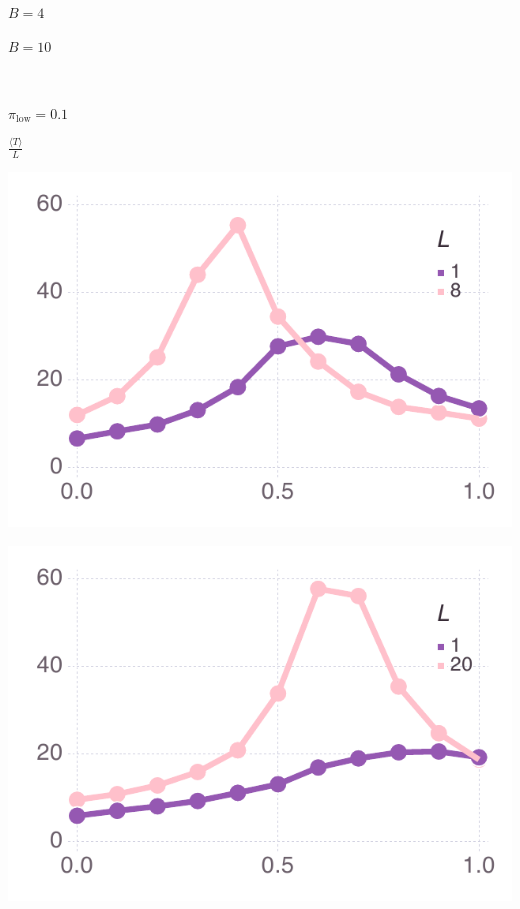 \documentclass[varwidth=true,crop=false]{standalone}
\newcommand{\pisub}[1]{\pi_{\mathrm{#1}}}
\newcommand{\pilow}{\pisub{low}}
\newcommand{\meanvar}[1]{\langle #1 \rangle}
\newcommand{\meanT}{\meanvar{T}}
\begin{document}
    \begin{minipage}{3.75in}
      \centering
      {\hspace{5.25em}\huge $B = 4$}
    \end{minipage}%
    \begin{minipage}{3.75in}
      \centering
      {\hspace{2.0em}\huge $B = 10$}
    \end{minipage}~\\

    \begin{minipage}{3.75in}
    \begin{rotate}{90}
      {\parbox{2.5in}{
          \centering
          \vspace{-2.5em} {\huge$ \pilow = 0.1$} \\
          {\begin{rotate}{-90}{\huge $\frac{\meanT}{L}$}\hspace{3em}\end{rotate}}
      }}
    \end{rotate}%
    \hspace{2em}
      \includegraphics[width=\textwidth]{Figures/step_over_u_lowpayoff=0.1_nbehaviors=4.pdf}
    \end{minipage}\noindent\begin{minipage}{3.75in}%
      \includegraphics[width=\textwidth]{Figures/step_over_u_lowpayoff=0.1_nbehaviors=10.pdf}
    \end{minipage}~\\[0.5em]
\end{document}
